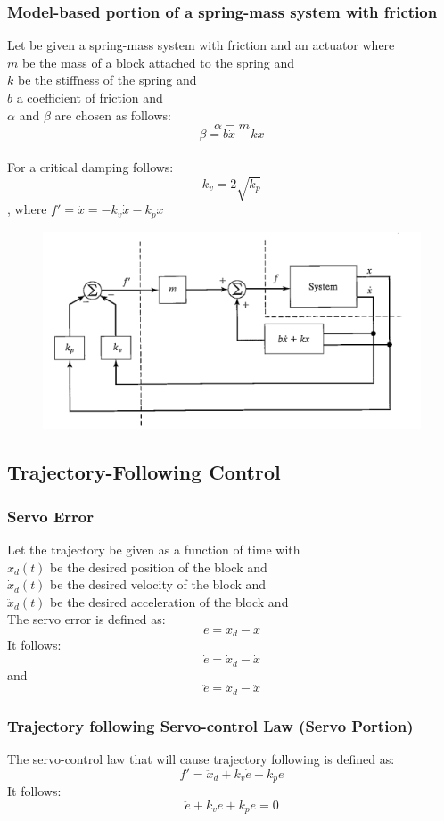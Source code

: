 \documentclass[10pt,a4paper]{article}
\begin{document}
\subsubsection{Model-based portion of a spring-mass system with friction}
Let be given a spring-mass system with friction and an actuator where \\
$m$ be the mass of a block attached to the spring and \\
$k$ be the stiffness of the spring and \\
$b$ a coefficient of friction and \\
$\alpha$ and $\beta$ are chosen as follows:
$$
	\alpha = m
$$
$$
	\beta = b \dot x + k x
$$
\\

For a critical damping follows: 
$$	
	k_v = 2\sqrt{k_p}
$$
, where $f' = \ddot x = -k_v \dot x - k_p x$

\begin{figure}[H]
	\includegraphics[width=0.5\columnwidth]{imgs/closed-loop_partitioned.png}
\end{figure}

\subsection{Trajectory-Following Control}
\subsubsection{Servo Error}
Let the trajectory be given as a function of time with\\
$x_d(t)$ be the desired position of the block and \\
$\dot x_d(t)$ be the desired velocity of the block and \\
$\ddot x_d(t)$ be the desired acceleration of the block and \\
The servo error is defined as:
$$
	e = x_d - x
$$
It follows:
$$
	\dot e = \dot x_d - \dot x
$$
and
$$
	\ddot e = \ddot x_d - \ddot x
$$

\subsubsection{Trajectory following Servo-control Law (Servo Portion)}
The servo-control law that will cause trajectory following is defined as:
$$
	f' = \ddot x_d + k_v \dot e + k_p e
$$
It follows:
$$
	\ddot e + k_v \dot e + k_p e = 0
$$
\end{document}
